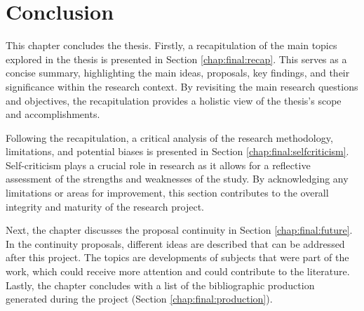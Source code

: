 
\chapter{Conclusion}\label{chap:final}
	
	
	This chapter concludes the thesis. Firstly, a recapitulation of the main topics explored in the thesis is presented in Section \ref{chap:final:recap}. This serves as a concise summary, highlighting the main ideas, proposals, key findings, and their significance within the research context. By revisiting the main research questions and objectives, the recapitulation provides a holistic view of the thesis's scope and accomplishments.
	
	Following the recapitulation, a critical analysis of the research methodology, limitations, and potential biases is presented in Section \ref{chap:final:selfcriticism}. Self-criticism plays a crucial role in research as it allows for a reflective assessment of the strengths and weaknesses of the study. By acknowledging any limitations or areas for improvement, this section contributes to the overall integrity and maturity of the research project.
	
	Next, the chapter discusses the proposal continuity in Section \ref{chap:final:future}. In the continuity proposals, different ideas are described that can be addressed after this project. The topics are developments of subjects that were part of the work, which could receive more attention and could contribute to the literature. Lastly, the chapter concludes with a list of the bibliographic production generated during the project (Section \ref{chap:final:production}). 
	
